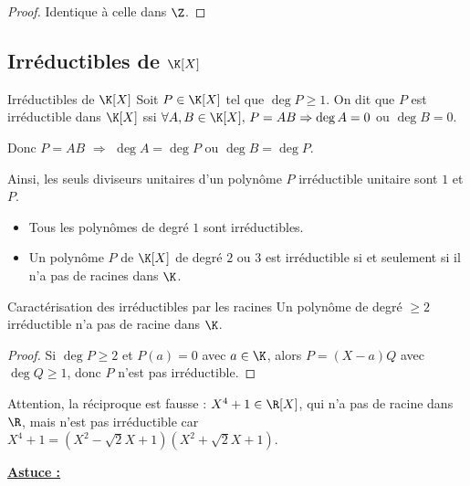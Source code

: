 \begin{proof}
    Identique à celle dans $\Z$.
\end{proof}

\subsection{Irréductibles de \texorpdfstring{$\K[X]$}{K[X]}}

\begin{definition}{Irréductibles de $\K[X]$}{}
    Soit $P \in \K[X]$ tel que $\deg P \geqslant 1$. On dit que $P$ est irréductible 
    dans $\K[X]$ ssi $\forall A, B \in \K[X], \, P = AB \Rightarrow \deg A = 0$ ou $\deg B = 0$.

    Donc $P = AB$ $\Rightarrow$ $\deg A = \deg P$ ou $\deg B = \deg P$.

    Ainsi, les seuls diviseurs unitaires d'un polynôme $P$ irréductible unitaire sont 
    $1$ et $P$.
\end{definition}

\begin{exemple}
    \begin{itemize}
        \item Tous les polynômes de degré $1$ sont irréductibles.
        \item Un polynôme $P$ de $\K[X]$ de degré $2$ ou $3$ est irréductible si et seulement si il n'a pas de racines dans $\K$.
    \end{itemize}
\end{exemple}

\begin{proposition}{Caractérisation des irréductibles par les racines}{}
    Un polynôme de degré $\geqslant 2$ irréductible n'a pas de racine dans $\K$.
\end{proposition}

\begin{proof}
    Si $\deg P \geqslant 2$ et $P(a) = 0$ avec $a \in \K$, alors
    $P = (X - a) Q$ avec $\deg Q \geqslant 1$, donc $P$ n'est pas irréductible.
\end{proof}

\begin{remarque}
    Attention, la réciproque est fausse :
    $X^4 + 1 \in \R[X]$, qui n'a pas de racine dans $\R$, mais n'est pas irréductible car 
    $X^4 + 1 = (X^2 - \sqrt 2 X + 1)(X^2 + \sqrt 2 X + 1)$.
\end{remarque}

\textbf{\uline{Astuce :}} 

